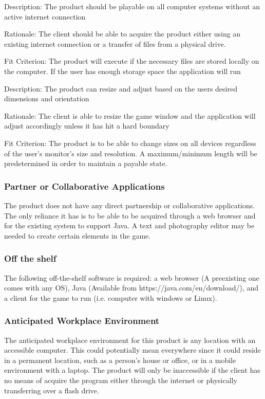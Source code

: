 \documentclass[12pt, titlepage]{article}
\begin{document}
Description: The product should be playable on all computer systems without an active internet connection

Rationale: The client should be able to acquire the product either using an existing internet connection or a transfer of files from a physical drive.

Fit Criterion: The product will execute if the necessary files are stored locally on the computer. If the user has enough storage space the application will run

Description: The product can resize and adjust based on the users desired dimensions and orientation

Rationale: The client is able to resize the game window and the application will adjust accordingly unless it has hit a hard boundary

Fit Criterion: The product is to be able to change sizes on all devices regardless of the user's monitor's size and resolution. A maximum/minimum length will be predetermined in order to maintain a payable state.
\subsubsection{Partner or Collaborative Applications}
The product does not have any direct partnership or collaborative applications. The only reliance it has is to be able to be acquired through a web browser and for the existing system to support Java. A text and photography editor may be needed to create certain elements in the game.

\subsubsection{Off the shelf}
The following off-the-shelf software is required: a web browser (A preexisting one comes with any OS), Java (Available from https://java.com/en/download/), and a client for the game to run (i.e. computer with windows or Linux).

\subsubsection{Anticipated Workplace Environment}
The anticipated workplace environment for this product is any location with an accessible computer. This could potentially mean everywhere since it could reside in a permanent location, such as a person's house or office, or in a mobile environment with a laptop. The product will only be inaccessible if the client has no means of acquire the program either through the internet or physically transferring over a flash drive.
\end{document}
